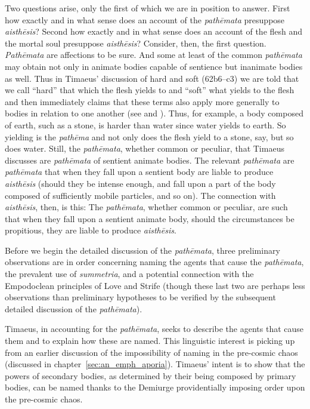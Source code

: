 Two questions arise, only the first of which we are in position to answer. First how exactly and in what sense does an account of the \emph{pathēmata} presuppose \emph{aisthēsis}? Second how exactly and in what sense does an account of the flesh and the mortal soul presuppose \emph{aisthēsis}? Consider, then, the first question. \emph{Pathēmata} are affections to be sure. And some at least of the common \emph{pathēmata} may obtain not only in animate bodies capable of sentience but inanimate bodies as well. Thus in Timaeus' discussion of hard and soft (62b6--c3) we are told that we call ``hard'' that which the flesh yields to and ``soft'' what yields to the flesh and then immediately claims that these terms also apply more generally to bodies in relation to one another (see \citealt[228, n6]{Archer-Hind:1888qd} and \citealt[110]{OBrien:1984ji}). Thus, for example, a body composed of earth, such as a stone, is harder than water since water yields to earth. So yielding is the \emph{pathēma} and not only does the flesh yield to a stone, say, but so does water. Still, the \emph{pathēmata}, whether common or peculiar, that Timaeus discusses are \emph{pathēmata} of sentient animate bodies. The relevant \emph{pathēmata} are \emph{pathēmata} that when they fall upon a sentient body are liable to produce \emph{aisthēsis} (should they be intense enough, and fall upon a part of the body composed of sufficiently mobile particles, and so on). The connection with \emph{aisthēsis}, then, is this: The \emph{pathēmata}, whether common or peculiar, are such that when they fall upon a sentient animate body, should the circumstances be propitious, they are liable to produce \emph{aisthēsis}.

Before we begin the detailed discussion of the \emph{pathēmata}, three preliminary observations are in order concerning naming the agents that cause the \emph{pathēmata}, the prevalent use of \emph{summetria}, and a potential connection with the Empodoclean principles of Love and Strife (though these last two are perhaps less observations than preliminary hypotheses to be verified by the subsequent detailed discussion of the \emph{pathēmata}).

Timaeus, in accounting for the \emph{pathēmata}, seeks to describe the agents that cause them and to explain how these are named. This linguistic interest is picking up from an earlier discussion of the impossibility of naming in the pre-cosmic chaos (discussed in chapter~\ref{sec:an_emph_aporia}). Timaeus' intent is to show that the powers of secondary bodies, as determined by their being composed by primary bodies, can be named thanks to the Demiurge providentially imposing order upon the pre-cosmic chaos.

